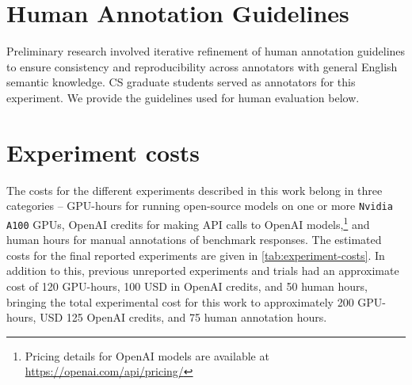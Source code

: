 \clearpage
\onecolumn
\section{Human Annotation Guidelines}
\label{app:human_annotation_guidelines}


\twocolumn
Preliminary research involved iterative refinement of human annotation guidelines to ensure consistency and reproducibility across annotators with general English semantic knowledge. CS graduate students served as annotators for this experiment. We provide the guidelines used for human evaluation below.

\section{Experiment costs}\label{app:experiment-costs}

The costs for the different experiments described in this work belong in three categories -- GPU-hours for running open-source models on one or more \texttt{Nvidia A100} GPUs, OpenAI credits for making API calls to OpenAI models,\footnote{Pricing details for OpenAI models are available at \url{https://openai.com/api/pricing/}} and human hours for manual annotations of benchmark responses. 
The estimated costs for the final reported experiments are given in \cref{tab:experiment-costs}. 
In addition to this, previous unreported experiments and trials had an approximate cost of 120 GPU-hours, 100 USD in OpenAI credits, and 50 human hours, bringing the total experimental cost for this work to approximately 200 GPU-hours, USD 125 OpenAI credits, and 75 human annotation hours.

